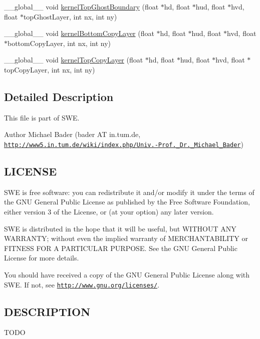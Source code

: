 \begin{DoxyCompactItemize}
\item 
\-\_\-\-\_\-global\-\_\-\-\_\- void \hyperlink{SWE__BlockCUDA__kernels_8hh_a7cf7164d51b1b16664556c25dd675a46}{kernel\-Top\-Ghost\-Boundary} (float $\ast$hd, float $\ast$hud, float $\ast$hvd, float $\ast$top\-Ghost\-Layer, int nx, int ny)
\item 
\-\_\-\-\_\-global\-\_\-\-\_\- void \hyperlink{SWE__BlockCUDA__kernels_8hh_af1a79800b1a5fca1daaeded30541769b}{kernel\-Bottom\-Copy\-Layer} (float $\ast$hd, float $\ast$hud, float $\ast$hvd, float $\ast$bottom\-Copy\-Layer, int nx, int ny)
\item 
\-\_\-\-\_\-global\-\_\-\-\_\- void \hyperlink{SWE__BlockCUDA__kernels_8hh_a48b8d7d4d3bf3c69a289df057f4b6f3e}{kernel\-Top\-Copy\-Layer} (float $\ast$hd, float $\ast$hud, float $\ast$hvd, float $\ast$top\-Copy\-Layer, int nx, int ny)
\end{DoxyCompactItemize}


\subsection{Detailed Description}
This file is part of S\-W\-E.

\begin{DoxyAuthor}{Author}
Michael Bader (bader A\-T in.\-tum.\-de, \href{http://www5.in.tum.de/wiki/index.php/Univ.-Prof._Dr._Michael_Bader}{\tt http\-://www5.\-in.\-tum.\-de/wiki/index.\-php/\-Univ.-\/\-Prof.\-\_\-\-Dr.\-\_\-\-Michael\-\_\-\-Bader})
\end{DoxyAuthor}
\hypertarget{Writer_8hh_LICENSE}{}\subsection{L\-I\-C\-E\-N\-S\-E}\label{Writer_8hh_LICENSE}
S\-W\-E is free software\-: you can redistribute it and/or modify it under the terms of the G\-N\-U General Public License as published by the Free Software Foundation, either version 3 of the License, or (at your option) any later version.

S\-W\-E is distributed in the hope that it will be useful, but W\-I\-T\-H\-O\-U\-T A\-N\-Y W\-A\-R\-R\-A\-N\-T\-Y; without even the implied warranty of M\-E\-R\-C\-H\-A\-N\-T\-A\-B\-I\-L\-I\-T\-Y or F\-I\-T\-N\-E\-S\-S F\-O\-R A P\-A\-R\-T\-I\-C\-U\-L\-A\-R P\-U\-R\-P\-O\-S\-E. See the G\-N\-U General Public License for more details.

You should have received a copy of the G\-N\-U General Public License along with S\-W\-E. If not, see \href{http://www.gnu.org/licenses/}{\tt http\-://www.\-gnu.\-org/licenses/}.\hypertarget{NetCdfWriter_8hh_DESCRIPTION}{}\subsection{D\-E\-S\-C\-R\-I\-P\-T\-I\-O\-N}\label{NetCdfWriter_8hh_DESCRIPTION}
T\-O\-D\-O 

